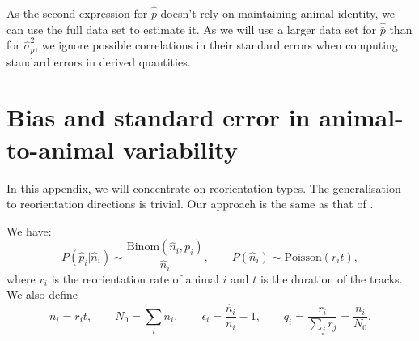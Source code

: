 \documentclass[12pt]{article}
\begin{document}
As the second expression for $\hat{\bar{p}}$ doesn't rely on maintaining animal identity, we can use the full data set to estimate it. As we will use a larger data set for $\hat{\bar{p}}$ than for $\hat{\sigma}_p^2$, we ignore possible correlations in their standard errors when computing standard errors in derived quantities.

\appendix

\section{Bias and standard error in animal-to-animal variability}\label{sec:varibias}

In this appendix, we will concentrate on reorientation types. The generalisation to reorientation directions is trivial. Our approach is the same as that of \cite{Roulston1999}.

We have:
%
\begin{equation}\label{eq:estdist}
  P(\hat{p}_i|\hat{n}_i) \sim \frac{\mathrm{Binom}(\hat{n}_i,p_i)}{\hat{n}_i},
  \qquad
  P(\hat{n}_i) \sim \mathrm{Poisson}(r_it),
\end{equation}
%
where $r_i$ is the reorientation rate of animal $i$ and $t$ is the duration of the tracks. We also define
%
\begin{equation}\label{eq:biasnot}
  n_i = r_it, \qquad
  N_0 = \sum_i n_i, \qquad
  \epsilon_i = \frac{\hat{n}_i}{n_i}-1, \qquad
  q_i = \frac{r_i}{\sum_j r_j} = \frac{n_i}{N_0}.
\end{equation}
%
\end{document}
